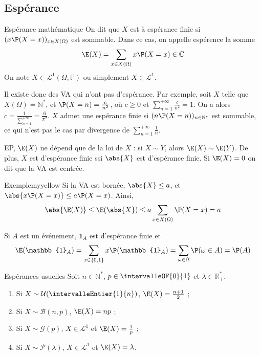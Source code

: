 \subsection{Espérance} 

    \begin{defi}{Espérance mathématique}{}
        On dit que $X$ est à espérance finie si $(x \P(X = x))_{x \in X(\Omega)}$ est sommable. Dans ce cas, on appelle espérence la somme 
        \[ \E(X) = \sum_{x \in X(\Omega)} x \P(X = x) \in \mathbb{C} \]   
        On note $X \in \mathcal{L}^1(\Omega, \mathbb{P})$ ou simplement $X \in \mathcal{L}^1$.
    \end{defi}

    Il existe donc des VA qui n’ont pas d’espérance. Par exemple, soit $X$ telle que $X(\Omega) = \mathbb{N}^*$, et $\P(X = n) = \frac{c}{n^2}$, où $c \geq 0$ et $\sum_{n = 1}^{+\infty} \frac{c}{n^2} = 1$. On a alors $c = \frac{1}{\sum_{n = 1}^{+\infty}} = \frac{6}{\pi^2}$. $X$ admet une espérance finie si $(n \P(X = n))_{n \in \mathbb{N}^*}$ est sommable, ce qui n’est pas le cas par divergence de $\sum_{n=1}^{+\infty} \frac{1}{n}$.

    EP, $\E(X)$ ne dépend que de la loi de $X$ : si $X \sim Y$, alors $\E(X) \sim \E(Y)$. De plus, $X$ est d’espérance finie ssi $\abs{X}$ est d’espérance finie. Si $\E(X) = 0$ on dit que la VA est centrée. 

    \begin{omed}{Exemple}{myyellow}
        Si la VA est bornée, $\abs{X} \leq a$, et $\abs{x \P(X = x)} \leq a \P(X = x)$. Ainsi, 
        \[ \abs{\E(X)} \leq \E(\abs{X}) \leq a \sum_{x \in X(\Omega)} \P(X = x) = a \]   

        Si $A$ est un événement, $\mathbb{1}_A$ est d’espérance finie et 
        \[ \E(\mathbb{1}_A) = \sum_{x \in \left\{0,1\right\}} x \P(\mathbb{1}_A) = \sum_{\omega \in \Omega} \P(\omega \in A) = \P(A) \]   
    \end{omed}

    \begin{theo}{Espérances usuelles}{}
        Soit $n \in \mathbb{N}^*$, $p \in \intervalleOF{0}{1}$ et $\lambda \in \mathbb{R}_+^*$. 
        \begin{enumerate}
            \item Si $X \sim \mathcal{U}(\intervalleEntier{1}{n})$, $\E(X) = \frac{n+1}{2}$ ;
            \item Si $X \sim \mathcal{B}(n,p)$, $\E(X) = np$ ;
            \item Si $X \sim \mathcal{G}(p)$, $X \in \mathcal{L}^1$ et $\E(X) = \frac{1}{p}$ ;
            \item Si $X \sim \mathcal{P}(\lambda)$, $X \in \mathcal{L}^1$ et $\E(X) = \lambda$. 
        \end{enumerate}
    \end{theo}

